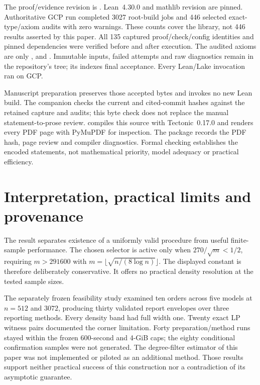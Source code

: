 \documentclass[11pt]{article}
\theoremstyle{remark}
\begin{document}
The proof/evidence revision is
\href{https://github.com/Quantyra/quantyra-null-cone-lean/tree/6752732882862bc848c7a96722a7660456d6da38}{}.
Lean~4.30.0 and mathlib revision
 are pinned.
Authoritative GCP run
completed 3027 root-build jobs and 446 selected exact-type/axiom
audits with zero warnings. These counts cover the library, not
446 results asserted by this paper. All 135 captured proof/check/config
identities and pinned dependencies were verified before and after
execution. The audited axioms are only ,
 and . Immutable inputs,
failed attempts and raw diagnostics remain in the repository's
 tree; its 
indexes final acceptance. Every Lean/Lake invocation ran on GCP.

Manuscript preparation preserves those accepted bytes and invokes no
new Lean build. The companion  checks the
current and cited-commit hashes against the retained capture and audits;
this byte check does not replace the manual statement-to-prose review.
 compiles this source with Tectonic~0.17.0 and renders
every PDF page with PyMuPDF for inspection. The package records the
PDF hash, page review and compiler diagnostics.
Formal checking establishes the encoded statements, not mathematical
priority, model adequacy or practical efficiency.

\section{Interpretation, practical limits and provenance}
\label{sec:limits}
The result separates existence of a uniformly valid procedure from
useful finite-sample performance. The chosen selector is active only
when $270/\sqrt m<1/2$, requiring $m>291600$ with
$m=\lfloor\sqrt{n/(8\log n)}\rfloor$. The displayed constant is
therefore deliberately conservative. It offers no practical density
resolution at the tested sample sizes.

The separately frozen feasibility study \cite{Study} examined ten
orders across five models at $n=512$ and $3072$, producing thirty
validated report envelopes over three reporting methods. Every density
band had full width one. Twenty exact LP witness pairs documented
the corner limitation. Forty preparation/method runs stayed within
the frozen 600-second and 4-GiB caps; the eighty conditional confirmation
samples were not generated. The degree-filter estimator of this paper
was not implemented or piloted as an additional method. Those results
support neither practical success of this construction nor a
contradiction of its asymptotic guarantee.
\end{document}
